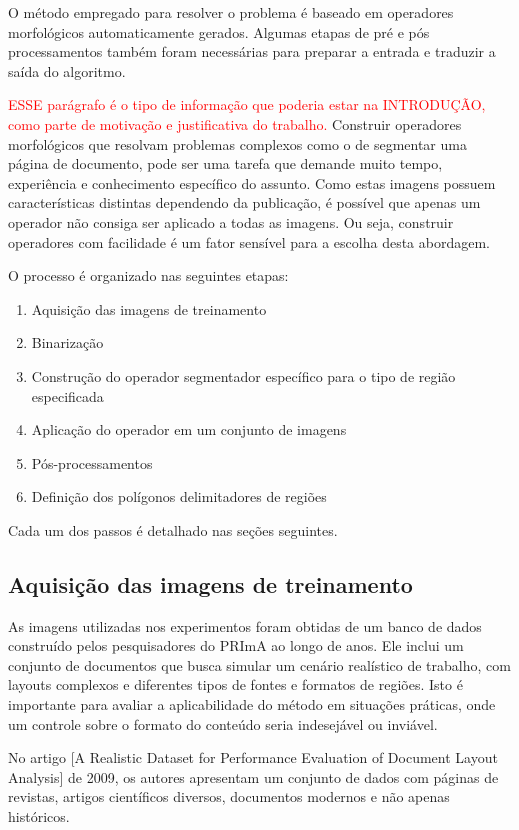 \documentclass[a4paper,11pt]{article}
\newcommand{\TODO}[1]{\textcolor{red}{#1}}
\begin{document}
O método empregado para resolver o problema é baseado em operadores morfológicos automaticamente gerados. Algumas etapas de pré e pós processamentos também foram necessárias para preparar a entrada e traduzir a saída do algoritmo.


\TODO{ESSE parágrafo é o tipo de informação que poderia estar na
  INTRODUÇÃO, como parte de motivação e justificativa do trabalho.}
Construir operadores morfológicos que resolvam problemas complexos como o de segmentar uma página de documento, pode ser uma tarefa que demande muito tempo, experiência e conhecimento específico do assunto. Como estas imagens possuem características distintas dependendo da publicação, é possível que apenas um operador não consiga ser aplicado a todas as imagens. Ou seja, construir operadores com facilidade é um fator sensível para a escolha desta abordagem.


    O processo é organizado nas seguintes etapas:

    \begin{enumerate}
      \item Aquisição das imagens de treinamento
      \item Binarização
      \item Construção do operador segmentador específico para o tipo de região especificada
      \item Aplicação do operador em um conjunto de imagens
      \item Pós-processamentos
      \item Definição dos polígonos delimitadores de regiões
    \end{enumerate}

    Cada um dos passos é detalhado nas seções seguintes.

    \subsection{Aquisição das imagens de treinamento}

      As imagens utilizadas nos experimentos foram obtidas de um banco de dados construído pelos pesquisadores do PRImA ao longo de anos. Ele inclui um conjunto de documentos que busca simular um cenário realístico de trabalho, com layouts complexos e diferentes tipos de fontes e formatos de regiões. Isto é importante para avaliar a aplicabilidade do método em situações práticas, onde um controle sobre o formato do conteúdo seria indesejável ou inviável.

      No artigo [A Realistic Dataset for Performance Evaluation of Document Layout Analysis] de 2009, os autores apresentam um conjunto de dados com páginas de revistas, artigos científicos diversos, documentos modernos e não apenas históricos.
\end{document}
